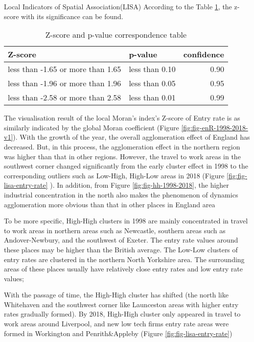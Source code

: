 \documentclass[
  12pt,
  oneside]{book}
\begin{document}
Local Indicators of Spatial Association(LISA)
According to the Table \ref{tab:tab-z-p-corr}, the z-score with its significance can be found.

\begin{table}

\caption{\label{tab:tab-z-p-corr}Z-score and p-value correspondence table}
\centering
\begin{tabular}[t]{llr}
\toprule
\textbf{Z-score} & \textbf{p-value} & \textbf{confidence}\\
\midrule
less than -1.65 or more than 1.65 & less than 0.10 & 0.90\\
less than -1.96 or more than 1.96 & less than 0.05 & 0.95\\
less than -2.58 or more than 2.58 & less than 0.01 & 0.99\\
\bottomrule
\end{tabular}
\end{table}

The visualisation result of the local Moran's index's Z-score of Entry rate is as similarly indicated by the global Moran coefficient (Figure \ref{fig:fig-enR-1998-2018-v1}). With the growth of the year, the overall agglomeration effect of England has decreased. But, in this process, the agglomeration effect in the northern region was higher than that in other regions. However, the travel to work areas in the southwest corner changed significantly from the early cluster effect in 1998 to the corresponding outliers such as Low-High, High-Low areas in 2018 (Figure \ref{fig:fig-lisa-entry-rate} ). In addition, from Figure \ref{fig:fig-hh-1998-2018}, the higher industrial concentration in the north also makes the phenomenon of dynamics agglomeration more obvious than that in other places in England area

To be more specific, High-High clusters in 1998 are mainly concentrated in travel to work areas in northern areas such as Newcastle, southern areas such as Andover-Newbury, and the southwest of Exeter. The entry rate values around these places may be higher than the British average. The Low-Low clusters of entry rates are clustered in the northern North Yorkshire area. The surrounding areas of these places usually have relatively close entry rates and low entry rate values;

With the passage of time, the High-High cluster has shifted (the north like Whitehaven and the southwest corner like Launceston areas with higher entry rates gradually formed). By 2018, High-High cluster only appeared in travel to work areas around Liverpool, and new low tech firms entry rate areas were formed in Workington and Penrith\&Appleby (Figure \ref{fig:fig-lisa-entry-rate})
\end{document}
